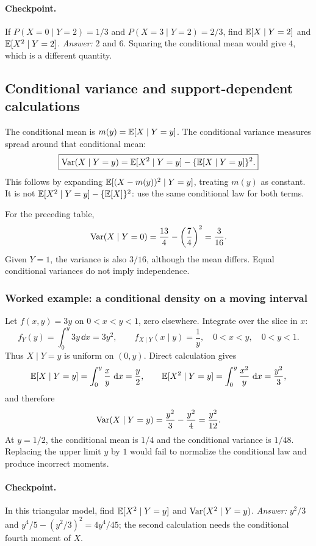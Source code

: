 \paragraph{Checkpoint.} If $P(X=0\mid Y=2)=1/3$ and $P(X=3\mid Y=2)=2/3$, find $\mathbb E[X\mid Y=2]$ and $\mathbb E[X^2\mid Y=2]$. \emph{Answer:} $2$ and $6$. Squaring the conditional mean would give $4$, which is a different quantity.

\subsection{Conditional variance and support-dependent calculations}
The conditional mean is $m(y)=\mathbb E[X\mid Y=y]$. The conditional variance measures spread around that conditional mean:
\[
\boxed{\operatorname{Var}(X\mid Y=y)
 =\mathbb E[X^2\mid Y=y]-\{\mathbb E[X\mid Y=y]\}^2.}
\]
This follows by expanding $\mathbb E[(X-m(y))^2\mid Y=y]$, treating $m(y)$ as constant. It is not $\mathbb E[X^2\mid Y=y]-\{\mathbb E[X]\}^2$: use the same conditional law for both terms.

For the preceding table,
\[
 \operatorname{Var}(X\mid Y=0)=\frac{13}{4}-\left(\frac74\right)^2=\frac3{16}.
\]
Given $Y=1$, the variance is also $3/16$, although the mean differs. Equal conditional variances do not imply independence.

\subsubsection*{Worked example: a conditional density on a moving interval}
Let $f(x,y)=3y$ on $0<x<y<1$, zero elsewhere. Integrate over the slice in $x$:
\[
 f_Y(y)=\int_0^y3y\,\dd x=3y^2,
 \qquad f_{X\mid Y}(x\mid y)=\frac1y,\quad0<x<y,
 \quad0<y<1.
\]
Thus $X\mid Y=y$ is uniform on $(0,y)$. Direct calculation gives
\[
 \mathbb E[X\mid Y=y]=\int_0^y\frac{x}{y}\,\,\mathrm d x=\frac y2,
 \qquad
 \mathbb E[X^2\mid Y=y]=\int_0^y\frac{x^2}{y}\,\,\mathrm d x=\frac{y^2}{3},
\]
and therefore
\[
 \operatorname{Var}(X\mid Y=y)=\frac{y^2}{3}-\frac{y^2}{4}=\frac{y^2}{12}.
\]
At $y=1/2$, the conditional mean is $1/4$ and the conditional variance is $1/48$. Replacing the upper limit $y$ by $1$ would fail to normalize the conditional law and produce incorrect moments.

\paragraph{Checkpoint.} In this triangular model, find $\mathbb E[X^2\mid Y=y]$ and $\operatorname{Var}(X^2\mid Y=y)$. \emph{Answer:} $y^2/3$ and $y^4/5-(y^2/3)^2=4y^4/45$; the second calculation needs the conditional fourth moment of $X$.

